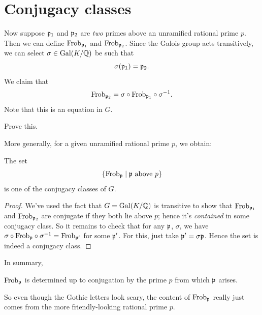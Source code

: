 \section{Conjugacy classes}
Now suppose $\mathfrak p_1$ and $\mathfrak p_2$ are \emph{two} primes above an unramified rational prime $p$.
Then we can define $\mathrm{Frob}_{\mathfrak p_1}$ and $\mathrm{Frob}_{\mathfrak p_2}$.
Since the Galois group acts transitively,
we can select $\sigma \in \operatorname{Gal}(K/\mathbb Q)$ be such that
\[ \sigma(\mathfrak p_1) = \mathfrak p_2. \]
We claim that
\[
	\mathrm{Frob}_{\mathfrak p_2} = \sigma \circ \mathrm{Frob}_{\mathfrak p_1} \circ \sigma^{-1}.
\]
Note that this is an equation in $G$.
\begin{ques}
	Prove this.
\end{ques}

More generally, for a given unramified rational prime $p$, we obtain:
\begin{theorem}
	The set
	\[ \left\{ \mathrm{Frob}_\mathfrak p \mid \mathfrak p \text{ above } p \right\} \]
	is one of the conjugacy classes of $G$.
\end{theorem}
\begin{proof}
	We've used the fact that $G = \operatorname{Gal}(K/\mathbb Q)$ is transitive
	to show that $\mathrm{Frob}_{\mathfrak p_1}$ and $\mathrm{Frob}_{\mathfrak p_2}$ are conjugate
	if they both lie above $p$; hence it's \emph{contained} in some
	conjugacy class.
	So it remains to check that for any $\mathfrak p$, $\sigma$,
	we have $\sigma \circ \mathrm{Frob}_\mathfrak p \circ \sigma^{-1} = \mathrm{Frob}_{\mathfrak p'}$
	for some $\mathfrak p'$. For this, just take $\mathfrak p' = \sigma\mathfrak p$.
	Hence the set is indeed a conjugacy class.
\end{proof}

In summary,
\begin{moral}
	$\mathrm{Frob}_{\mathfrak p}$ is determined up to conjugation by the prime $p$
	from which $\mathfrak p$ arises.
\end{moral}
So even though the Gothic letters look scary, the content of $\mathrm{Frob}_{\mathfrak p}$
really just comes from the more friendly-looking rational prime $p$.


